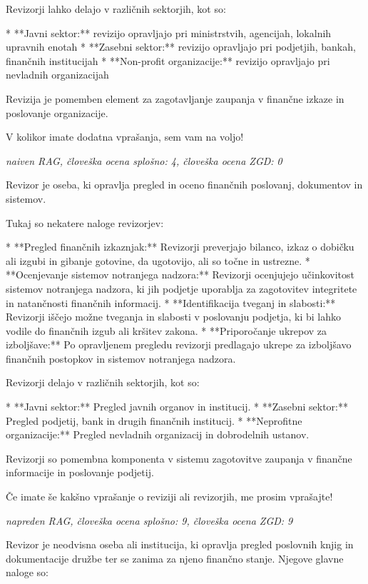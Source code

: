 \documentclass[a4paper,12pt,openright]{book}
\begin{document}
Revizorji lahko delajo v različnih sektorjih, kot so:

* **Javni sektor:** revizijo opravljajo pri ministrstvih, agencijah, lokalnih upravnih enotah
* **Zasebni sektor:** revizijo opravljajo pri podjetjih, bankah, finančnih institucijah
* **Non-profit organizacije:** revizijo opravljajo pri nevladnih organizacijah

Revizija je pomemben element za zagotavljanje zaupanja v finančne izkaze in poslovanje organizacije.


V kolikor imate dodatna vprašanja, sem vam na voljo!

\vspace{0.5cm}
\textit{naiven RAG, človeška ocena splošno: 4, človeška ocena ZGD: 0}

Revizor je oseba, ki opravlja pregled in oceno finančnih poslovanj, dokumentov in sistemov.

Tukaj so nekatere naloge revizorjev:

* **Pregled finančnih izkaznjak:** Revizorji preverjajo bilanco, izkaz o dobičku ali izgubi in gibanje gotovine, da ugotovijo, ali so točne in ustrezne.
* **Ocenjevanje sistemov notranjega nadzora:** Revizorji ocenjujejo učinkovitost sistemov notranjega nadzora, ki jih podjetje uporablja za zagotovitev integritete in natančnosti finančnih informacij.
* **Identifikacija tveganj in slabosti:** Revizorji iščejo možne tveganja in slabosti v poslovanju podjetja, ki bi lahko vodile do finančnih izgub ali kršitev zakona.
* **Priporočanje ukrepov za izboljšave:** Po opravljenem pregledu revizorji predlagajo ukrepe za izboljšavo finančnih postopkov in sistemov notranjega nadzora.

Revizorji delajo v različnih sektorjih, kot so:

* **Javni sektor:**  Pregled javnih organov in institucij.
* **Zasebni sektor:** Pregled podjetij, bank in drugih finančnih institucij.
* **Neprofitne organizacije:** Pregled nevladnih organizacij in dobrodelnih ustanov.

 Revizorji so pomembna komponenta v sistemu zagotovitve zaupanja v finančne informacije in poslovanje podjetij.


Če imate še kakšno vprašanje o reviziji ali revizorjih, me prosim vprašajte!

\vspace{0.5cm}
\textit{napreden RAG, človeška ocena splošno: 9, človeška ocena ZGD: 9}

Revizor je neodvisna oseba ali institucija, ki opravlja pregled poslovnih knjig in dokumentacije družbe ter se zanima za njeno finančno stanje. Njegove glavne naloge so:
\end{document}
